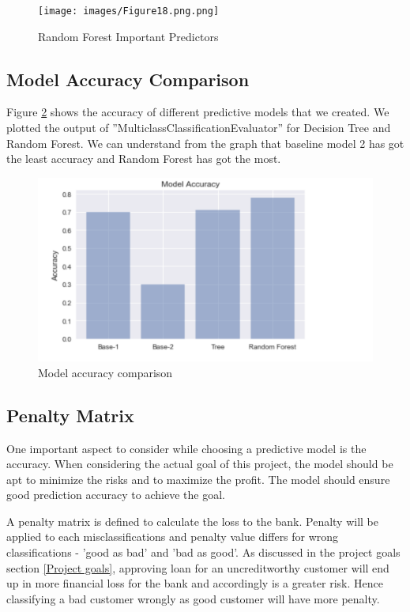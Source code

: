 \documentclass[sigconf]{acmart}
\begin{document}
\begin{figure}[htb]
  \centering
  \texttt{[image: images/Figure18.png.png]}
  \caption{Random Forest Important Predictors}
  \label{fig:Figure18} 
\end{figure}

\subsection{Model Accuracy Comparison} 

Figure \ref{fig:Figure19} shows the accuracy of different predictive models that we created. We plotted the output of ''MulticlassClassificationEvaluator'' for Decision Tree and Random Forest. We can understand from the graph that baseline model 2 has got the least accuracy and Random Forest has got the most. 

\begin{figure}[htb]
  \centering
  \includegraphics[width=1.0\columnwidth]{images/Figure19.png}
  \caption{Model accuracy comparison
  \cite{german-credit-sri-sai}}
  \label{fig:Figure19} 
\end{figure}

\subsection{Penalty Matrix} 

One important aspect to consider while choosing a predictive model is the accuracy. When considering the actual goal of this project, the model should be apt to minimize the risks and to maximize the profit. The model should ensure good prediction accuracy to achieve the goal. 

A penalty matrix is defined to calculate the loss to the bank. Penalty will be applied to each misclassifications and penalty value differs for wrong classifications - 'good as bad' and 'bad as good'. As discussed in the project goals section \ref{Project goals}, approving loan for an uncreditworthy customer will end up in more financial loss for the bank and accordingly is a greater risk. Hence classifying a bad customer wrongly as good customer will have more penalty.  
\end{document}
